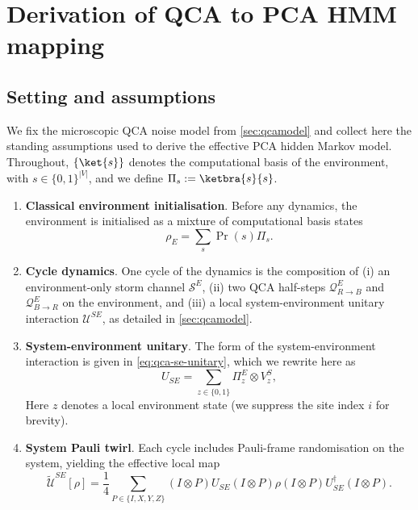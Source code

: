 \section{Derivation of QCA to PCA HMM mapping}\label{app:qca-pca-mapping}

\subsection{Setting and assumptions}
We fix the microscopic QCA noise model from \cref{sec:qcamodel} and collect here the standing assumptions used to derive the effective PCA hidden Markov model. Throughout, \(\{\ket{s}\}\) denotes the computational basis of the environment, with \(s\in\{0,1\}^{|V|}\), and we define \(\Pi_s:=\ketbra{s}{s}\).
\begin{enumerate}
    \item[(A1)] \textbf{Classical environment initialisation}. Before any dynamics, the environment is initialised as a mixture of computational basis states
    \begin{equation}\label{eq:initial_rho_env}
        \rho_E = \sum_s \Pr(s) \Pi_s.
    \end{equation}
    \item[(A2)] \textbf{Cycle dynamics}. One cycle of the dynamics is the composition of (i) an environment-only storm channel \(\mathcal{S}^E\), (ii) two QCA half-steps \(\mathcal{Q}_{R\to B}^E\) and \(\mathcal{Q}_{B\to R}^E\) on the environment, and (iii) a local system-environment unitary interaction \(\mathcal{U}^{SE}\), as detailed in \cref{sec:qcamodel}.
    \item[(A3)] \textbf{System-environment unitary}.
    The form of the system-environment interaction is given in \cref{eq:qca-se-unitary}, which we rewrite here as
    \begin{equation}
        U_{SE}=\sum_{z\in\{0,1\}}\Pi_z^E\otimes V_z^S,
        \label{eq:app-controlled-use}
    \end{equation}
    Here \(z\) denotes a local environment state (we suppress the site index \(i\) for brevity).
    \item[(A4)] \textbf{System Pauli twirl}.
    Each cycle includes Pauli-frame randomisation on the system, yielding the effective local map
    \begin{equation}
        \widetilde{\mathcal{U}}^{SE}[\rho] = \frac{1}{4}\sum_{P\in\{I,X,Y,Z\}} (I \otimes P) U_{SE} (I \otimes P) \rho (I \otimes P) U_{SE}^\dagger (I \otimes P).
    \end{equation}

\end{enumerate}
